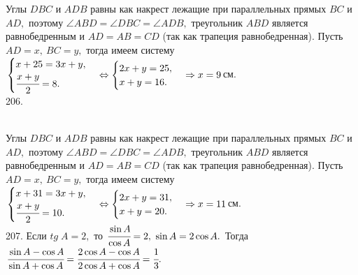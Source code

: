 \documentclass[12pt]{article}
\begin{document}
Углы $DBC$ и $ADB$ равны как накрест лежащие при параллельных прямых $BC$ и $AD,$ поэтому $\angle ABD=\angle DBC=\angle ADB,$ треугольник $ABD$ является равнобедренным и $AD=AB=CD$ (так как трапеция равнобедренная). Пусть $AD=x,\ BC=y,$ тогда имеем систему\\ $\begin{cases} x+25=3x+y,\\ \cfrac{x+y}{2}=8. \end{cases}
\Leftrightarrow  \begin{cases} 2x+y=25,\\ x+y=16. \end{cases} \Rightarrow x=9$см.\\
206. \begin{figure}[ht!]
\end{figure}\\
Углы $DBC$ и $ADB$ равны как накрест лежащие при параллельных прямых $BC$ и $AD,$ поэтому $\angle ABD=\angle DBC=\angle ADB,$ треугольник $ABD$ является равнобедренным и $AD=AB=CD$ (так как трапеция равнобедренная). Пусть $AD=x,\ BC=y,$ тогда имеем систему\\ $\begin{cases} x+31=3x+y,\\ \cfrac{x+y}{2}=10. \end{cases}
\Leftrightarrow  \begin{cases} 2x+y=31,\\ x+y=20. \end{cases} \Rightarrow x=11$см.\\
207. Если $tg\; A=2,$ то $\cfrac{\sin A}{\cos A}=2,\ \sin A=2\cos A.$ Тогда $\cfrac{\sin A -\cos A}{\sin A +\cos A}=\cfrac{2\cos A -\cos A}{2\cos A +\cos A}=\cfrac{1}{3}.$\\
\end{document}
